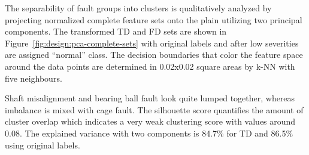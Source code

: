 The separability of fault groups into clusters is qualitatively analyzed by projecting normalized complete feature sets onto the plain utilizing two principal components. The transformed TD and FD sets are shown in Figure~\ref{fig:design:pca-complete-sets} with original labels and after low severities are assigned ``normal'' class. The decision boundaries that color the feature space around the data points are determined in 0.02x0.02 square areas by k-NN with five neighbours.

Shaft misalignment and bearing ball fault look quite lumped together, whereas imbalance is mixed with cage fault. The silhouette score quantifies the amount of cluster overlap which indicates a very weak clustering score with values around 0.08. The explained variance with two components is 84.7\% for TD and 86.5\% using original labels.


